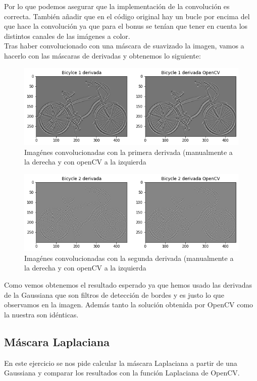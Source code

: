 \documentclass[12pt,spanish]{article}
\begin{document}
Por lo que podemos asegurar que la implementación de la convolución es correcta. También añadir que en el código original hay un bucle por encima del que hace la convolución ya que para el bonus se tenían que tener en cuenta los distintos canales de las imágenes a color. \\

Tras haber convolucionado con una máscara de suavizado la imagen, vamos a hacerlo con las máscaras de derivadas y obtenemos lo siguiente:

\begin{figure}[H]
	\centering
	\includegraphics[width=\textwidth]{./imagenes_memoria/conv_1d_bycicle.png}
	\caption{Imagénes convolucionadas con la primera derivada (manualmente a la derecha y con openCV a la izquierda}
	\label{conv_1d_bycicle}
\end{figure}

\begin{figure}[H]
	\centering
	\includegraphics[width=\textwidth]{./imagenes_memoria/conv_2d_bycicle.png}
	\caption{Imagénes convolucionadas con la segunda derivada (manualmente a la derecha y con openCV a la izquierda}
	\label{conv_2d_bycicle}
\end{figure}

Como vemos obtenemos el resultado esperado ya que hemos usado las derivadas de la Gaussiana que son filtros de detección de bordes y es justo lo que observamos en la imagen. Además tanto la solución obtenida por OpenCV como la nuestra son idénticas. 

\subsection{Máscara Laplaciana}
En este ejercicio se nos pide calcular la máscara Laplaciana a partir de una Gaussiana y comparar los resultados con la función Laplaciana de OpenCV. \\
\end{document}
